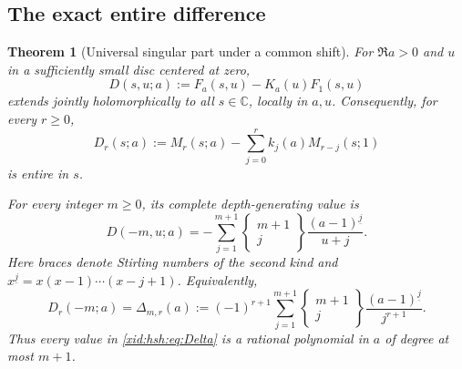 \documentclass[11pt,a4paper]{article}
\numberwithin{equation}{section}
\newtheorem{theorem}{Theorem}[section]
\theoremstyle{definition}
\theoremstyle{remark}
\begin{document}
\subsection{The exact entire difference}

\begin{theorem}[Universal singular part under a common shift]
\label{xid:hsh:thm:entire}
For $\Re a>0$ and $u$ in a sufficiently small disc centered at zero,
\begin{equation}\label{xid:hsh:eq:D}
 D(s,u;a):=F_a(s,u)-K_a(u)F_1(s,u)
\end{equation}
extends jointly holomorphically to all $s\in\mathbb C$, locally in $a,u$.
Consequently, for every $r\ge0$,
\begin{equation}\label{xid:hsh:eq:Dr}
 D_r(s;a):=M_r(s;a)-\sum_{j=0}^rk_j(a)M_{r-j}(s;1)
\end{equation}
is entire in $s$.

For every integer $m\ge0$, its complete depth-generating value is
\begin{equation}\label{xid:hsh:eq:T}
 \boxed{\quad D(-m,u;a)
 =-\sum_{j=1}^{m+1}
       {\left\{\begin{matrix}m+1\\j\end{matrix}\right\}}
       \frac{(a-1)^{\underline j}}{u+j}.\quad}
\end{equation}
Here braces denote Stirling numbers of the second kind and
$x^{\underline j}=x(x-1)\cdots(x-j+1)$.
Equivalently,
\begin{equation}\label{xid:hsh:eq:Delta}
 \boxed{\quad
 D_r(-m;a)=\Delta_{m,r}(a):=
 (-1)^{r+1}\sum_{j=1}^{m+1}
       {\left\{\begin{matrix}m+1\\j\end{matrix}\right\}}
       \frac{(a-1)^{\underline j}}{j^{r+1}}.
 \quad}
\end{equation}
Thus every value in \eqref{xid:hsh:eq:Delta} is a rational polynomial in $a$
of degree at most $m+1$.
\end{theorem}
\end{document}
